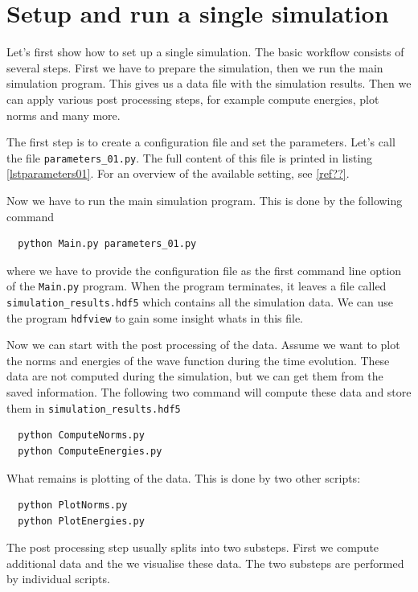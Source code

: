 \documentclass[a4paper,10pt]{report}
\begin{document}
\section{Setup and run a single simulation}

Let's first show how to set up a single simulation. The basic workflow consists of
several steps. First we have to prepare the simulation, then we run the main simulation
program. This gives us a data file with the simulation results. Then we can apply various
post processing steps, for example compute energies, plot norms and many more.

The first step is to create a configuration file and set the parameters. Let's
call the file \texttt{parameters\_01.py}. The full content of this file is printed
in listing \ref{lstparameters01}. For an overview of the available setting, see \ref{ref??}.

Now we have to run the main simulation program. This is done by the following command

\begin{verbatim}
  python Main.py parameters_01.py
\end{verbatim}

where we have to provide the configuration file as the first command line option
of the \texttt{Main.py} program. When the program terminates, it leaves a file
called \texttt{simulation\_results.hdf5} which contains all the simulation data.
We can use the program \texttt{hdfview} to gain some insight whats in this file.

Now we can start with the post processing of the data. Assume we want to plot
the norms and energies of the wave function during the time evolution. These data
are not computed during the simulation, but we can get them from the saved
information. The following two command will compute these data and store them
in \texttt{simulation\_results.hdf5}

\begin{verbatim}
  python ComputeNorms.py
  python ComputeEnergies.py
\end{verbatim}

What remains is plotting of the data. This is done by two other scripts:

\begin{verbatim}
  python PlotNorms.py
  python PlotEnergies.py
\end{verbatim}

The post processing step usually splits into two substeps. First we compute additional
data and the we visualise these data. The two substeps are performed by individual
scripts.
\end{document}
